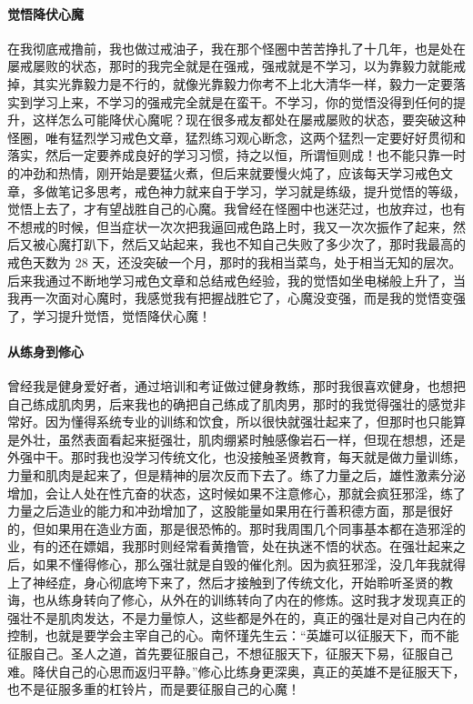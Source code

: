 \paragraph{觉悟降伏心魔}

在我彻底戒撸前，我也做过戒油子，我在那个怪圈中苦苦挣扎了十几年，也是处在屡戒屡败的状态，那时的我完全就是在强戒，强戒就是不学习，以为靠毅力就能戒掉，其实光靠毅力是不行的，就像光靠毅力你考不上北大清华一样，毅力一定要落实到学习上来，不学习的强戒完全就是在蛮干。不学习，你的觉悟没得到任何的提升，这样怎么可能降伏心魔呢？现在很多戒友都处在屡戒屡败的状态，要突破这种怪圈，唯有猛烈学习戒色文章，猛烈练习观心断念，这两个猛烈一定要好好贯彻和落实，然后一定要养成良好的学习习惯，持之以恒，所谓恒则成！也不能只靠一时的冲劲和热情，刚开始是要猛火煮，但后来就要慢火炖了，应该每天学习戒色文章，多做笔记多思考，戒色神力就来自于学习，学习就是练级，提升觉悟的等级，觉悟上去了，才有望战胜自己的心魔。我曾经在怪圈中也迷茫过，也放弃过，也有不想戒的时候，但当症状一次次把我逼回戒色路上时，我又一次次振作了起来，然后又被心魔打趴下，然后又站起来，我也不知自己失败了多少次了，那时我最高的戒色天数为 28 天，还没突破一个月，那时的我相当菜鸟，处于相当无知的层次。后来我通过不断地学习戒色文章和总结戒色经验，我的觉悟如坐电梯般上升了，当我再一次面对心魔时，我感觉我有把握战胜它了，心魔没变强，而是我的觉悟变强了，学习提升觉悟，觉悟降伏心魔！

\paragraph{从练身到修心}

曾经我是健身爱好者，通过培训和考证做过健身教练，那时我很喜欢健身，也想把自己练成肌肉男，后来我也的确把自己练成了肌肉男，那时的我觉得强壮的感觉非常好。因为懂得系统专业的训练和饮食，所以很快就强壮起来了，但那时也只能算是外壮，虽然表面看起来挺强壮，肌肉绷紧时触感像岩石一样，但现在想想，还是外强中干。那时我也没学习传统文化，也没接触圣贤教育，每天就是做力量训练，力量和肌肉是起来了，但是精神的层次反而下去了。练了力量之后，雄性激素分泌增加，会让人处在性亢奋的状态，这时候如果不注意修心，那就会疯狂邪淫，练了力量之后造业的能力和冲劲增加了，这股能量如果用在行善积德方面，那是很好的，但如果用在造业方面，那是很恐怖的。那时我周围几个同事基本都在造邪淫的业，有的还在嫖娼，我那时则经常看黄撸管，处在执迷不悟的状态。在强壮起来之后，如果不懂得修心，那么强壮就是自毁的催化剂。因为疯狂邪淫，没几年我就得上了神经症，身心彻底垮下来了，然后才接触到了传统文化，开始聆听圣贤的教诲，也从练身转向了修心，从外在的训练转向了内在的修炼。这时我才发现真正的强壮不是肌肉发达，不是力量惊人，这些都是外在的，真正的强壮是对自己内在的控制，也就是要学会主宰自己的心。南怀瑾先生云：“英雄可以征服天下，而不能征服自己。圣人之道，首先要征服自己，不想征服天下，征服天下易，征服自己难。降伏自己的心思而返归平静。”修心比练身更深奥，真正的英雄不是征服天下，也不是征服多重的杠铃片，而是要征服自己的心魔！

